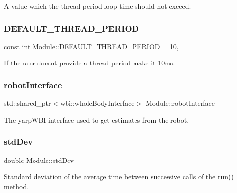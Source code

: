 A value which the thread period loop time should not exceed. \hypertarget{classModule_af73cdfdae53c52ea8488d0d8c4f9083f}{}\label{classModule_af73cdfdae53c52ea8488d0d8c4f9083f} 
\subsubsection{\texorpdfstring{D\+E\+F\+A\+U\+L\+T\+\_\+\+T\+H\+R\+E\+A\+D\+\_\+\+P\+E\+R\+I\+OD}{DEFAULT\_THREAD\_PERIOD}}
{\footnotesize\ttfamily const int Module\+::\+D\+E\+F\+A\+U\+L\+T\+\_\+\+T\+H\+R\+E\+A\+D\+\_\+\+P\+E\+R\+I\+OD = 10\hspace{0.3cm}{\ttfamily [static]}, {\ttfamily [private]}}

If the user doesn\textquotesingle{}t provide a thread period make it 10ms. \hypertarget{classModule_a0d3efedabcef6ec0db88011ccc2e7205}{}\label{classModule_a0d3efedabcef6ec0db88011ccc2e7205} 
\subsubsection{\texorpdfstring{robot\+Interface}{robotInterface}}
{\footnotesize\ttfamily std\+::shared\+\_\+ptr$<$wbi\+::whole\+Body\+Interface$>$ Module\+::robot\+Interface\hspace{0.3cm}{\ttfamily [private]}}

The yarp\+W\+BI interface used to get estimates from the robot. \hypertarget{classModule_af66a2dab82208cb2ea25da22fcaaa4a3}{}\label{classModule_af66a2dab82208cb2ea25da22fcaaa4a3} 
\subsubsection{\texorpdfstring{std\+Dev}{stdDev}}
{\footnotesize\ttfamily double Module\+::std\+Dev\hspace{0.3cm}{\ttfamily [private]}}

Standard deviation of the average time between successive calls of the {\ttfamily run()} method. \hypertarget{classModule_a57060f2788b6dc9906e66432e775e5ac}{}\label{classModule_a57060f2788b6dc9906e66432e775e5ac} 
